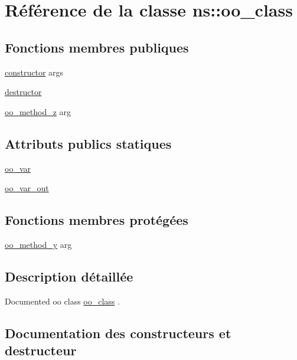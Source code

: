 \hypertarget{classns_1_1oo__class}{}\section{Référence de la classe ns\+:\+:oo\+\_\+class}
\label{classns_1_1oo__class}
\subsection*{Fonctions membres publiques}
\begin{DoxyCompactItemize}
\item 
\hyperlink{classns_1_1oo__class_aa26b64151d4b4b0e8b4977aae7048f9b}{constructor} args
\item 
\hyperlink{classns_1_1oo__class_af148cfc1c090a05986c68ac9452a510a}{destructor}
\item 
\hyperlink{classns_1_1oo__class_a8a3cfbae3b3fca463f08adb9174a5fe8}{oo\+\_\+method\+\_\+z} arg
\end{DoxyCompactItemize}
\subsection*{Attributs publics statiques}
\begin{DoxyCompactItemize}
\item 
\hyperlink{classns_1_1oo__class_a741f11f4a2db3876205658d4a9a279ba}{oo\+\_\+var}
\item 
\hyperlink{classns_1_1oo__class_af46293ede16067c38ca2901416cad8ee}{oo\+\_\+var\+\_\+out}
\end{DoxyCompactItemize}
\subsection*{Fonctions membres protégées}
\begin{DoxyCompactItemize}
\item 
\hyperlink{classns_1_1oo__class_ad07feb192f34010ed66d123338c7acdd}{oo\+\_\+method\+\_\+y} arg
\end{DoxyCompactItemize}


\subsection{Description détaillée}
Documented oo class {\ttfamily \hyperlink{classns_1_1oo__class}{oo\+\_\+class}} . 

\subsection{Documentation des constructeurs et destructeur}
\hypertarget{classns_1_1oo__class_aa26b64151d4b4b0e8b4977aae7048f9b}{}

